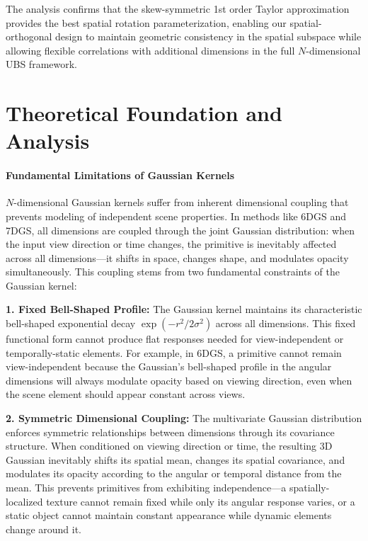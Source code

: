 \documentclass{article} %
\begin{document}
The analysis confirms that the skew-symmetric 1st order Taylor approximation provides the best spatial rotation parameterization, enabling our spatial-orthogonal design to maintain geometric consistency in the spatial subspace while allowing flexible correlations with additional dimensions in the full $N$-dimensional UBS framework.

\section{Theoretical Foundation and Analysis}
\label{app:Theoretical Foundation and Analysis}

\paragraph{Fundamental Limitations of Gaussian Kernels}

$N$-dimensional Gaussian kernels suffer from inherent dimensional coupling that prevents modeling of independent scene properties. In methods like 6DGS and 7DGS, all dimensions are coupled through the joint Gaussian distribution: when the input view direction or time changes, the primitive is inevitably affected across all dimensions—it shifts in space, changes shape, and modulates opacity simultaneously. This coupling stems from two fundamental constraints of the Gaussian kernel:

\textbf{1. Fixed Bell-Shaped Profile:} The Gaussian kernel maintains its characteristic bell-shaped exponential decay $\exp(-r^2/2\sigma^2)$ across all dimensions. This fixed functional form cannot produce flat responses needed for view-independent or temporally-static elements. For example, in 6DGS, a primitive cannot remain view-independent because the Gaussian's bell-shaped profile in the angular dimensions will always modulate opacity based on viewing direction, even when the scene element should appear constant across views.

\textbf{2. Symmetric Dimensional Coupling:} The multivariate Gaussian distribution enforces symmetric relationships between dimensions through its covariance structure. When conditioned on viewing direction or time, the resulting 3D Gaussian inevitably shifts its spatial mean, changes its spatial covariance, and modulates its opacity according to the angular or temporal distance from the mean. This prevents primitives from exhibiting independence—a spatially-localized texture cannot remain fixed while only its angular response varies, or a static object cannot maintain constant appearance while dynamic elements change around it.
\end{document}

